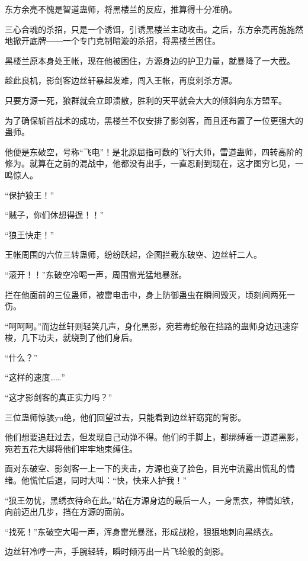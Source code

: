 
\begin{this_body}

东方余亮不愧是智道蛊师，将黑楼兰的反应，推算得十分准确。

三心合魂的杀招，只是一个诱饵，引诱黑楼兰主动攻击。之后，东方余亮再施施然地掀开底牌――一个专门克制暗漩的杀招，将黑楼兰困住。

黑楼兰原本身处王帐，现在他被困住，方源身边的护卫力量，就暴降了一大截。

趁此良机，影剑客边丝轩暴起发难，闯入王帐，再度刺杀方源。

只要方源一死，狼群就会立即溃散，胜利的天平就会大大的倾斜向东方盟军。

为了确保斩首战术的成功，黑楼兰不仅安排了影剑客，而且还布置了一位更强大的蛊师。

他便是东破空，号称“飞电”！是北原屈指可数的飞行大师，雷道蛊师，四转高阶的修为。就算在之前的混战中，他都没有出手，一直忍耐到现在，这才图穷匕见，一鸣惊人。

“保护狼王！”

“贼子，你们休想得逞！！”

“狼王快走！”

王帐周围的六位三转蛊师，纷纷跃起，企图拦截东破空、边丝轩二人。

“滚开！！”东破空冷喝一声，周围雷光猛地暴涨。

拦在他面前的三位蛊师，被雷电击中，身上防御蛊虫在瞬间毁灭，顷刻间两死一伤。

“呵呵呵。”而边丝轩则轻笑几声，身化黑影，宛若毒蛇般在挡路的蛊师身边迅速穿梭，几下功夫，就绕到了他们身后。

“什么？”

“这样的速度……”

“这才影剑客的真正实力吗？”

三位蛊师惊骇yu绝，他们回望过去，只能看到边丝轩窈窕的背影。

他们想要追赶过去，但发现自己动弹不得。他们的手脚上，都绑缚着一道道黑影，宛若五花大绑将他们牢牢地束缚住。

面对东破空、影剑客一上一下的夹击，方源也变了脸色，目光中流露出慌乱的情绪。他慌忙后退，同时大叫：“快，快来人护我！”

“狼王勿忧，黑绣衣待命在此。”站在方源身边的最后一人，一身黑衣，神情如铁，向前迈出几步，挡在方源的面前。

“找死！”东破空大喝一声，浑身雷光暴涨，形成战枪，狠狠地刺向黑绣衣。

边丝轩冷哼一声，手腕轻转，瞬时倾泻出一片飞轮般的剑影。


\end{this_body}
